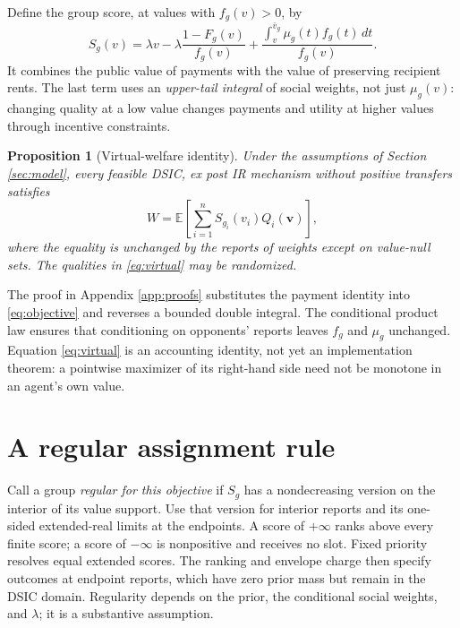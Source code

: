 \documentclass[11pt]{article}
\newtheorem{proposition}{Proposition}
\newcommand{\E}{\mathbb E}
\begin{document}
Define the group score, at values with $f_g(v)>0$, by
\begin{equation}\label{eq:score}
S_g(v)=\lambda v-\lambda\frac{1-F_g(v)}{f_g(v)}
+\frac{\int_v^{\bar v_g}\mu_g(t)f_g(t)\,dt}{f_g(v)}.
\end{equation}
It combines the public value of payments with the value of preserving recipient rents. The last term uses an \emph{upper-tail integral} of social weights, not just $\mu_g(v)$: changing quality at a low value changes payments and utility at higher values through incentive constraints.

\begin{proposition}[Virtual-welfare identity]\label{prop:identity}
Under the assumptions of Section \ref{sec:model}, every feasible DSIC, ex post IR mechanism without positive transfers satisfies
\begin{equation}\label{eq:virtual}
W=\E\!\left[\sum_{i=1}^n S_{g_i}(v_i)Q_i(\mathbf v)\right],
\end{equation}
where the equality is unchanged by the reports of weights except on value-null sets. The qualities in \eqref{eq:virtual} may be randomized.
\end{proposition}

The proof in Appendix \ref{app:proofs} substitutes the payment identity into \eqref{eq:objective} and reverses a bounded double integral. The conditional product law ensures that conditioning on opponents' reports leaves $f_g$ and $\mu_g$ unchanged. Equation \eqref{eq:virtual} is an accounting identity, not yet an implementation theorem: a pointwise maximizer of its right-hand side need not be monotone in an agent's own value.

\section{A regular assignment rule}\label{sec:regular}

Call a group \emph{regular for this objective} if $S_g$ has a nondecreasing version on the interior of its value support. Use that version for interior reports and its one-sided extended-real limits at the endpoints. A score of $+\infty$ ranks above every finite score; a score of $-\infty$ is nonpositive and receives no slot. Fixed priority resolves equal extended scores. The ranking and envelope charge then specify outcomes at endpoint reports, which have zero prior mass but remain in the DSIC domain. Regularity depends on the prior, the conditional social weights, and $\lambda$; it is a substantive assumption.
\end{document}
